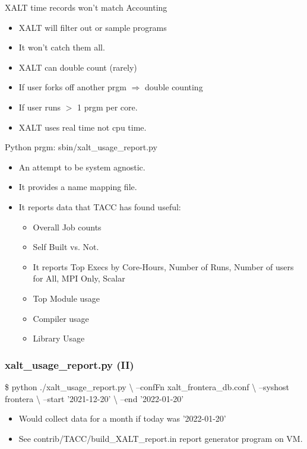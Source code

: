 \documentclass{beamer}
\begin{document}
\begin{frame}{XALT time records won't match Accounting}
  \begin{itemize}
    \item XALT will filter out or sample programs
    \item It won't catch them all.
    \item XALT can double count (rarely)
    \item If user forks off another prgm $\Rightarrow$ double counting
    \item If user runs $>$ 1 prgm per core.
    \item XALT uses real time not cpu time.
  \end{itemize}
\end{frame}

\begin{frame}{Python prgm: sbin/xalt\_usage\_report.py}
  \begin{itemize}
    \item An attempt to be system agnostic.
    \item It provides a name mapping file.
    \item It reports data that TACC has found useful:
      \begin{itemize}
        \item Overall Job counts
        \item Self Built vs. Not.
        \item It reports Top Execs by Core-Hours, Number of Runs,
          Number of users for All, MPI Only, Scalar
        \item Top Module usage
        \item Compiler usage
        \item Library Usage
      \end{itemize}
  \end{itemize}
\end{frame}

\begin{frame}[fragile]
    \frametitle{xalt\_usage\_report.py (II)}
 {\small
    \begin{semiverbatim}
\$ python ./xalt_usage_report.py           \textbackslash
        --confFn xalt_frontera_db.conf    \textbackslash
        --syshost frontera                \textbackslash
        --start '2021-12-20'              \textbackslash
        --end   '2022-01-20'
    \end{semiverbatim}
}
  \begin{itemize}
    \item Would collect data for a month if today was '2022-01-20'
    \item See contrib/TACC/build\_XALT\_report.in report generator
      program on VM.
  \end{itemize}

\end{frame}
\end{document}
